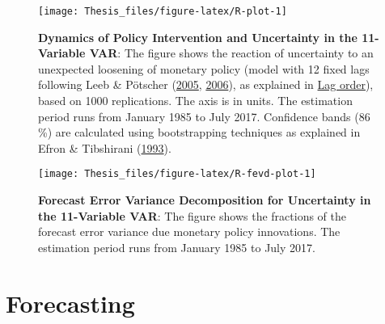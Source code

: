 \documentclass[12pt,twoside]{reedthesis}
\begin{document}
\begin{figure}

{\centering \texttt{[image: Thesis\_files/figure-latex/R-plot-1]} 

}

\caption[Dynamics of Policy Intervention and Uncertainty in the 11-Variable VAR]{\textbf{Dynamics of Policy Intervention and Uncertainty in the 11-Variable VAR}: The figure shows the reaction of uncertainty to an unexpected loosening of monetary policy (model with 12 fixed lags following Leeb \& Pötscher (\protect\hyperlink{ref-leebpots:2005}{2005}, \protect\hyperlink{ref-leebpots:2006}{2006}), as explained in \protect\hyperlink{lag-order}{Lag order}), based on 1000 replications. The axis is in units. The estimation period runs from January 1985 to July 2017. Confidence bands (86 \%) are calculated using bootstrapping techniques as explained in Efron \& Tibshirani (\protect\hyperlink{ref-efrotibs:1993}{1993}).}\label{fig:R-plot}
\end{figure}

\begin{figure}

{\centering \texttt{[image: Thesis\_files/figure-latex/R-fevd-plot-1]} 

}

\caption[Forecast Error Variance Decomposition for Uncertainty in the 11-Variable VAR]{\textbf{Forecast Error Variance Decomposition for Uncertainty in the 11-Variable VAR}: The figure shows the fractions of the forecast error variance due monetary policy innovations. The estimation period runs from January 1985 to July 2017.}\label{fig:R-fevd-plot}
\end{figure}
\hypertarget{forecasting}{%
\section{Forecasting}\label{forecasting}}
\end{document}
